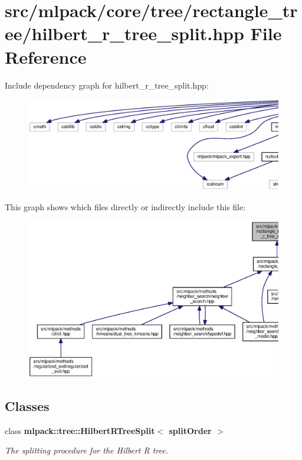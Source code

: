 \section{src/mlpack/core/tree/rectangle\+\_\+tree/hilbert\+\_\+r\+\_\+tree\+\_\+split.hpp File Reference}
\label{hilbert__r__tree__split_8hpp}
Include dependency graph for hilbert\+\_\+r\+\_\+tree\+\_\+split.\+hpp\+:
\nopagebreak
\begin{figure}[H]
\begin{center}
\leavevmode
\includegraphics[width=350pt]{hilbert__r__tree__split_8hpp__incl}
\end{center}
\end{figure}
This graph shows which files directly or indirectly include this file\+:
\nopagebreak
\begin{figure}[H]
\begin{center}
\leavevmode
\includegraphics[width=350pt]{hilbert__r__tree__split_8hpp__dep__incl}
\end{center}
\end{figure}
\subsection*{Classes}
\begin{DoxyCompactItemize}
\item 
class {\bf mlpack\+::tree\+::\+Hilbert\+R\+Tree\+Split$<$ split\+Order $>$}
\begin{DoxyCompactList}\small\item\em The splitting procedure for the Hilbert R tree. \end{DoxyCompactList}\end{DoxyCompactItemize}
